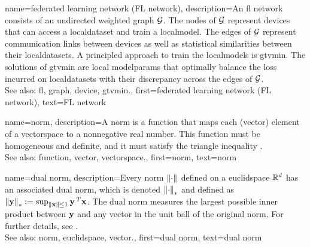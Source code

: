 {name={federated learning network (FL network)},
	description={An \gls{fl} network consists of 
		an undirected weighted \gls{graph} $\mathcal{G}$. The nodes of $\mathcal{G}$ represent \glspl{device} 
		that can access a \gls{localdataset} and train a \gls{localmodel}. The edges of $\mathcal{G}$ represent 
		communication links between \glspl{device} as well as statistical similarities between their \glspl{localdataset}. 
		A principled approach to train the \glspl{localmodel} is \gls{gtvmin}. The solutions of \gls{gtvmin} are local 
		\gls{modelparams} that optimally balance the \gls{loss} incurred on \glspl{localdataset} with their discrepancy 
		across the edges of $\mathcal{G}$.
	    			\\ 
		See also: \gls{fl}, \gls{graph}, \gls{device}, \gls{gtvmin}.},
	first={federated learning network (FL network)},
	text={FL network} 
}

{name={norm},
	description={A norm is a \gls{function} that maps each (\gls{vector}) element 
		of a \gls{vectorspace} to a nonnegative real number. This \gls{function} must be 
		homogeneous and definite, and it must satisfy the triangle inequality \cite{HornMatAnalysis}.
		\\
		See also: \gls{function}, \gls{vector}, \gls{vectorspace}.},
	first={norm},
	text={norm} 
}

{name={dual norm},
	description={Every \gls{norm} $\left\Vert {\cdot} \right\Vert_{}$ defined on a \gls{euclidspace} $\mathbb{R}^{d}$ 
		has an associated dual \gls{norm}, which is denoted $\left\Vert {\cdot} \right\Vert_{*}$ and defined as 
		$\left\Vert {{\bf y}} \right\Vert_{*} := \sup_{\Vert {{\bf x}} \Vert{} \le 1} {\bf y}\,^{T} {\bf x}$. 
		The dual \gls{norm} measures the largest possible inner product between ${\bf y}$ 
		and any \gls{vector} in the unit ball of the original \gls{norm}. For further details, see 
		\cite[Sec.~A.1.6]{BoydConvexBook}.
					\\ 
		See also: \gls{norm}, \gls{euclidspace}, \gls{vector}.},
	first={dual norm},
	text={dual norm}
}

